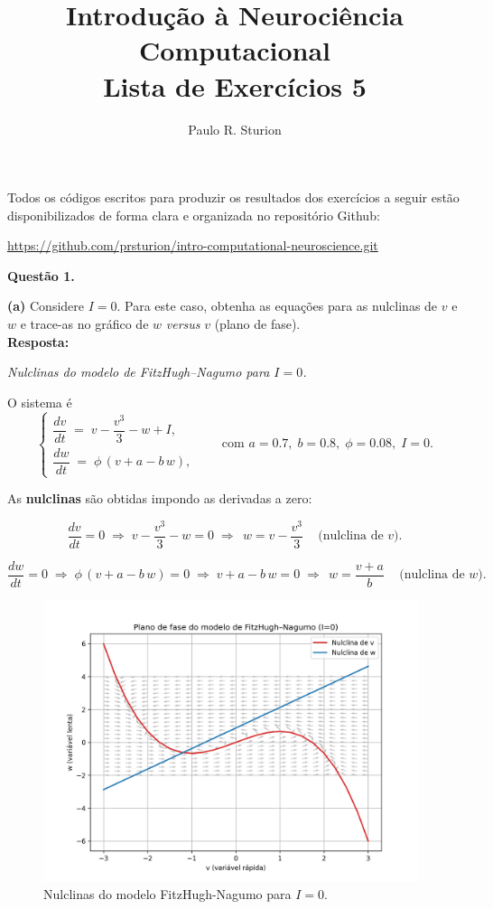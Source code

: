 \documentclass[english,11pt,a4paper]{article}
\title{Introdução à Neurociência Computacional\\Lista de Exercícios 5}
\author{Paulo R. Sturion}
\begin{document}
	\maketitle
	
	\noindent Todos os códigos escritos para produzir os resultados dos exercícios a seguir estão disponibilizados de forma clara e organizada no repositório Github:
	
	\begin{center}
		\noindent \href{https://github.com/prsturion/intro-computational-neurosciene.git}{https://github.com/prsturion/intro-computational-neuroscience.git} \newline
	\end{center}
	
	\noindent\textbf{Questão 1.}
	
	\noindent\textbf{(a)} Considere $I = 0$. Para este caso, obtenha as equações para as nulclinas de $v$ e $w$ e trace-as no gráfico de $w$ \textit{versus} $v$ (plano de fase).\\
	
	\noindent\textbf{Resposta:}
	
	\noindent\textit{Nulclinas do modelo de FitzHugh--Nagumo para $I=0$.}
	
	\noindent O sistema é
	\[
	\begin{cases}
		\dfrac{dv}{dt} \;=\; v - \dfrac{v^3}{3} - w + I,\\[4pt]
		\dfrac{dw}{dt} \;=\; \phi\,(v + a - b\,w),
	\end{cases}
	\qquad
	\text{com } a=0.7,\; b=0.8,\; \phi=0.08,\; I=0.
	\]
	
	\noindent As \textbf{nulclinas} são obtidas impondo as derivadas a zero:
	
	\[
	\frac{dv}{dt}=0 
	\;\Longrightarrow\;
	v - \frac{v^3}{3} - w = 0
	\;\Longrightarrow\;
	\boxed{\,w = v - \dfrac{v^3}{3}\,}
	\quad \text{(nulclina de $v$).}
	\]
	
	\[
	\frac{dw}{dt}=0 
	\;\Longrightarrow\;
	\phi\,(v + a - b\,w)=0
	\;\Longrightarrow\;
	v + a - b\,w = 0
	\;\Longrightarrow\;
	\boxed{\,w = \dfrac{v + a}{b}\,}
	\quad \text{(nulclina de $w$).}
	\]
	
	\begin{figure}[H]
		\centering
		\includegraphics[width=11cm]{../figures/ex_1a.png}
		\caption{Nulclinas do modelo FitzHugh-Nagumo para $I = 0$.}
	\end{figure}
	
\end{document}

